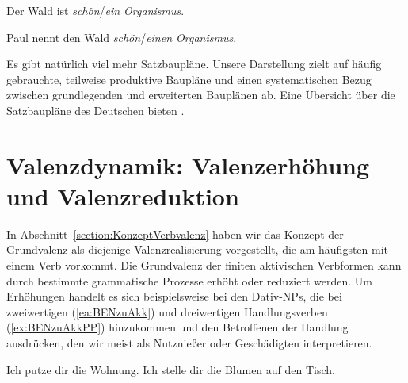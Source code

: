 \ea \label{ea:NomPräd}  
\ea \label{ea:sein_Eigenschaft} Der Wald ist \textit{schön}/\textit{ein Organismus}.
\z 
\z 

\ea \label{ex:AkkPräd}  
\ea \label{ea:nennen_A_Eigenschaft} Paul nennt den Wald \textit{schön}/\textit{einen Organismus}.
\z
\z 

Es gibt natürlich viel mehr Satzbaupläne. Unsere Darstellung zielt auf häufig gebrauchte, teilweise produktive Baupläne und einen systematischen Bezug zwischen grundlegenden und erweiterten Bauplänen ab. Eine Übersicht über die Satzbaupläne des Deutschen bieten \citet[235--241]{AgelHoellein2021}.


\section{Valenzdynamik: Valenzerhöhung und Valenzreduktion}\label{subsection:Valenzdynamik}

In Abschnitt~\ref{section:KonzeptVerbvalenz} haben wir das Konzept der Grundvalenz als diejenige Valenzrealisierung vorgestellt, die am häufigsten mit einem Verb vorkommt. Die Grundvalenz der finiten aktivischen Verbformen kann durch bestimmte grammatische Prozesse erhöht oder reduziert werden. Um Erhöhungen handelt es sich beispielsweise bei den Dativ-NPs, die bei zweiwertigen (\ref{ea:BENzuAkk}) und dreiwertigen Handlungsverben (\ref{ex:BENzuAkkPP}) hinzukommen und den Betroffenen der Handlung ausdrücken, den wir meist als Nutznießer oder Geschädigten interpretieren. 

\ea \label{ea:freie_Dative}
\ea \label{ea:BENzuAkk} Ich putze dir die Wohnung. 
\ex \label{ex:BENzuAkkPP} Ich stelle dir die Blumen auf den Tisch.
\z 
\z 


